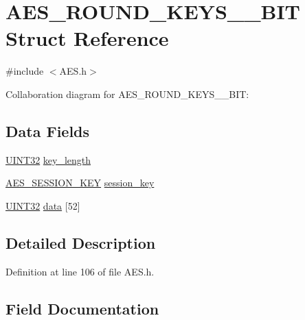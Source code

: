 \hypertarget{struct_a_e_s___r_o_u_n_d___k_e_y_s__192___b_i_t}{}\section{A\+E\+S\+\_\+\+R\+O\+U\+N\+D\+\_\+\+K\+E\+Y\+S\+\_\+\_\+\+B\+I\+T Struct Reference}
\label{struct_a_e_s___r_o_u_n_d___k_e_y_s__192___b_i_t}


{\ttfamily \#include $<$A\+E\+S.\+h$>$}



Collaboration diagram for A\+E\+S\+\_\+\+R\+O\+U\+N\+D\+\_\+\+K\+E\+Y\+S\+\_\+\_\+\+B\+I\+T\+:
\subsection*{Data Fields}
\begin{DoxyCompactItemize}
\item 
\hyperlink{_generic_type_defs_8h_a1720f33f59b583f0c2ed071815623a86}{U\+I\+N\+T32} \hyperlink{struct_a_e_s___r_o_u_n_d___k_e_y_s__192___b_i_t_aa42d871fcd1183159392e19781181b56}{key\+\_\+length}
\item 
\hyperlink{_a_e_s___e_c_b___p_i_c32_8h_a0e0971acf88a8f0e37953380fcbb10b3}{A\+E\+S\+\_\+\+S\+E\+S\+S\+I\+O\+N\+\_\+\+K\+E\+Y} \hyperlink{struct_a_e_s___r_o_u_n_d___k_e_y_s__192___b_i_t_a8188e88d5ecaef25564a4afaaf888573}{session\+\_\+key}
\item 
\hyperlink{_generic_type_defs_8h_a1720f33f59b583f0c2ed071815623a86}{U\+I\+N\+T32} \hyperlink{struct_a_e_s___r_o_u_n_d___k_e_y_s__192___b_i_t_a948c3205fda0946d9a990ba087ecbb9d}{data} \mbox{[}52\mbox{]}
\end{DoxyCompactItemize}


\subsection{Detailed Description}


Definition at line 106 of file A\+E\+S.\+h.



\subsection{Field Documentation}
\hypertarget{struct_a_e_s___r_o_u_n_d___k_e_y_s__192___b_i_t_a948c3205fda0946d9a990ba087ecbb9d}{}
